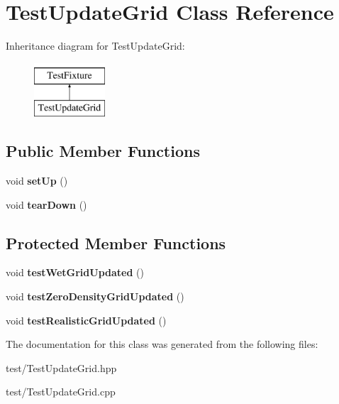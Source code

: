 \hypertarget{class_test_update_grid}{}\section{Test\+Update\+Grid Class Reference}
\label{class_test_update_grid}
Inheritance diagram for Test\+Update\+Grid\+:\begin{figure}[H]
\begin{center}
\leavevmode
\includegraphics[height=2.000000cm]{class_test_update_grid}
\end{center}
\end{figure}
\subsection*{Public Member Functions}
\begin{DoxyCompactItemize}
\item 
\mbox{\label{class_test_update_grid_a0a50fd0d318cb2fe27dfc7fa5c8a0f33}} 
void {\bfseries set\+Up} ()
\item 
\mbox{\label{class_test_update_grid_a482b2a4a0f2fd8252032bde4b28c3778}} 
void {\bfseries tear\+Down} ()
\end{DoxyCompactItemize}
\subsection*{Protected Member Functions}
\begin{DoxyCompactItemize}
\item 
\mbox{\label{class_test_update_grid_a96aa33a3e1362f9a24237c234a13f3b9}} 
void {\bfseries test\+Wet\+Grid\+Updated} ()
\item 
\mbox{\label{class_test_update_grid_ac9edeb07286572669ab1464895f3f452}} 
void {\bfseries test\+Zero\+Density\+Grid\+Updated} ()
\item 
\mbox{\label{class_test_update_grid_a5ae8a15bf6d4fc2429b9e0b0946b08c8}} 
void {\bfseries test\+Realistic\+Grid\+Updated} ()
\end{DoxyCompactItemize}


The documentation for this class was generated from the following files\+:\begin{DoxyCompactItemize}
\item 
test/Test\+Update\+Grid.\+hpp\item 
test/Test\+Update\+Grid.\+cpp\end{DoxyCompactItemize}
